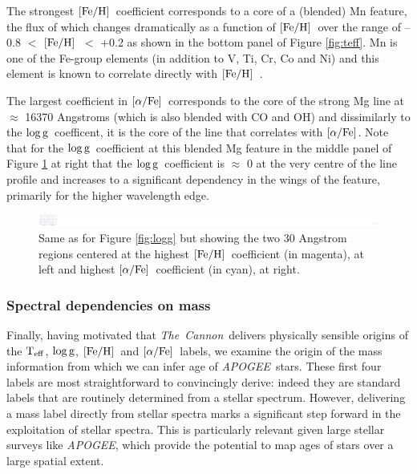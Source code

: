 \documentclass[12pt, preprint]{aastex}
\newcommand{\project}[1]{\textsl{#1}}
\newcommand{\tc}{\project{The~Cannon}}
\newcommand{\apogee}{\project{APOGEE}}
\newcommand{\teff}{\mbox{$\rm T_{eff}$}}
\newcommand{\feh}{\mbox{$\rm [Fe/H]$}}
\newcommand{\alphafe}{\mbox{$\rm [\alpha/Fe]$}}
\newcommand{\logg}{\mbox{$\rm \log g$}}
\begin{document}
The strongest \feh\ coefficient corresponds to a core of a (blended) Mn feature, the flux of which changes dramatically as a function of \feh\ over the range of  --0.8 $<$ \feh\ $<$ +0.2 as shown in the bottom panel of Figure \ref{fig:teff}. Mn is one of the Fe-group elements (in addition to V, Ti, Cr, Co and Ni) and this element is known to correlate directly with \feh\ \citep[see][]{Maria2008, B2015}. 

The largest coefficient in \alphafe\ corresponds to the core of the strong Mg line at $\approx$ 16370 Angstroms (which is also blended with CO and OH) and dissimilarly to the \logg\ coefficent, it is the core of the line that correlates with \alphafe. Note that for the \logg\ coefficient at this blended Mg feature in the middle panel of Figure \ref{fig:feha} at right that the \logg\ coefficient is $\approx$ 0 at the very centre of the line profile and increases to a significant dependency in the wings of the feature, primarily for the higher wavelength edge. 


\begin{figure}[h!]
\centering
    \includegraphics[scale=0.51]{./plots/coeffs_af_3.png}
  \caption{Same as for Figure \ref{fig:logg} but showing the two 30 Angstrom regions centered at the highest \feh\ coefficient (in magenta), at left and highest \alphafe\ coefficient (in cyan), at right.}
\label{fig:feha}
\end{figure}



\subsubsection{Spectral dependencies on mass} 

Finally, having motivated that \tc\ delivers physically sensible origins of the \teff, \logg, \feh\ and \alphafe\ labels, we examine the origin of the mass information from which we can infer age of \apogee\ stars. 
These first four labels are most straightforward  to convincingly derive: indeed they are standard labels that are routinely determined from a stellar spectrum. However, delivering a mass label directly from stellar spectra marks a significant step forward in the exploitation of stellar spectra. This is particularly relevant given large stellar surveys like \apogee, which provide the potential to map ages of stars over a large spatial extent. 
\end{document}
